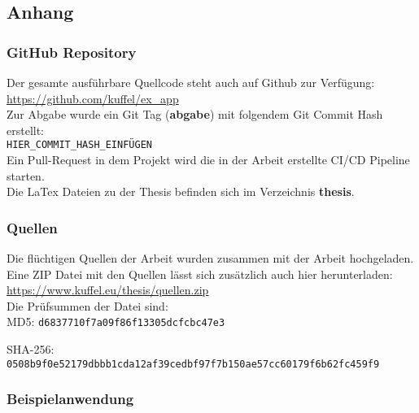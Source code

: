 \subsection*{Anhang}\label{anhang}

\subsubsection*{GitHub Repository}\label{anhang_github}

Der gesamte ausführbare Quellcode steht auch auf Github zur Verfügung: \\

\href{https://github.com/kuffel/ex\_app}{https://github.com/kuffel/ex\_app} \\

Zur Abgabe wurde ein Git Tag (\textbf{abgabe}) mit folgendem Git Commit Hash erstellt: \\

\texttt{HIER\_COMMIT\_HASH\_EINFÜGEN}
\\

Ein Pull-Request in dem Projekt wird die in der Arbeit erstellte CI/CD Pipeline starten. \\

Die LaTex Dateien zu der Thesis befinden sich im Verzeichnis \textbf{thesis}.

\subsubsection*{Quellen}\label{anhang_quellen}

Die flüchtigen Quellen der Arbeit wurden zusammen mit der Arbeit hochgeladen.
Eine ZIP Datei mit den Quellen lässt sich zusätzlich auch hier herunterladen: \\

\href{https://www.kuffel.eu/thesis/quellen.zip}{https://www.kuffel.eu/thesis/quellen.zip} \\

Die Prüfsummen der Datei sind: \\

MD5: \texttt{d6837710f7a09f86f13305dcfcbc47e3}

SHA-256: \texttt{0508b9f0e52179dbbb1cda12af39cedbf97f7b150ae57cc60179f6b62fc459f9}

\newpage
\subsubsection*{Beispielanwendung}\label{anhang_beispielanwendung}








